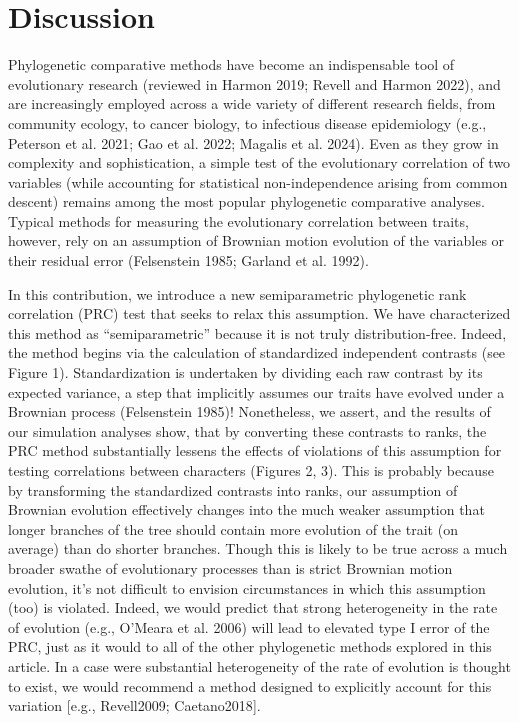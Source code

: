 \documentclass[fleqn,10pt,lineno]{wlpeerj} %
\begin{document}
\section{Discussion}\label{discussion}

Phylogenetic comparative methods have become an indispensable tool of evolutionary research (reviewed in Harmon 2019; Revell and Harmon 2022), and are increasingly employed across a wide variety of different research fields, from community ecology, to cancer biology, to infectious disease epidemiology (e.g., Peterson et al. 2021; Gao et al. 2022; Magalis et al. 2024). Even as they grow in complexity and sophistication, a simple test of the evolutionary correlation of two variables (while accounting for statistical non-independence arising from common descent) remains among the most popular phylogenetic comparative analyses. Typical methods for measuring the evolutionary correlation between traits, however, rely on an assumption of Brownian motion evolution of the variables or their residual error (Felsenstein 1985; Garland et al. 1992).

In this contribution, we introduce a new semiparametric phylogenetic rank correlation (PRC) test that seeks to relax this assumption. We have characterized this method as ``semiparametric'' because it is not truly distribution-free. Indeed, the method begins via the calculation of standardized independent contrasts (see Figure 1). Standardization is undertaken by dividing each raw contrast by its expected variance, a step that implicitly assumes our traits have evolved under a Brownian process (Felsenstein 1985)! Nonetheless, we assert, and the results of our simulation analyses show, that by converting these contrasts to ranks, the PRC method substantially lessens the effects of violations of this assumption for testing correlations between characters (Figures 2, 3). This is probably because by transforming the standardized contrasts into ranks, our assumption of Brownian evolution effectively changes into the much weaker assumption that longer branches of the tree should contain more evolution of the trait (on average) than do shorter branches. Though this is likely to be true across a much broader swathe of evolutionary processes than is strict Brownian motion evolution, it's not difficult to envision circumstances in which this assumption (too) is violated. Indeed, we would predict that strong heterogeneity in the rate of evolution (e.g., O'Meara et al. 2006) will lead to elevated type I error of the PRC, just as it would to all of the other phylogenetic methods explored in this article. In a case were substantial heterogeneity of the rate of evolution is thought to exist, we would recommend a method designed to explicitly account for this variation {[}e.g., Revell2009; Caetano2018{]}.
\end{document}
